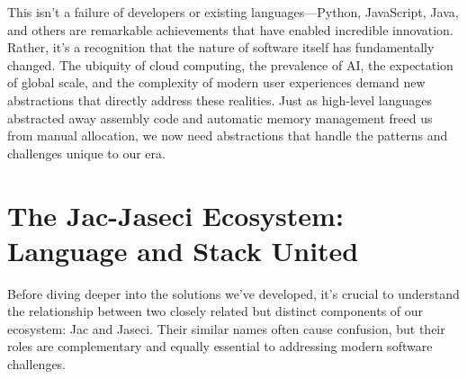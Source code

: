 This isn't a failure of developers or existing languages—Python, JavaScript, Java, and others are remarkable achievements that have enabled incredible innovation. Rather, it's a recognition that the nature of software itself has fundamentally changed. The ubiquity of cloud computing, the prevalence of AI, the expectation of global scale, and the complexity of modern user experiences demand new abstractions that directly address these realities. Just as high-level languages abstracted away assembly code and automatic memory management freed us from manual allocation, we now need abstractions that handle the patterns and challenges unique to our era.

\section{The Jac-Jaseci Ecosystem: Language and Stack United}

Before diving deeper into the solutions we've developed, it's crucial to understand the relationship between two closely related but distinct components of our ecosystem: Jac and Jaseci. Their similar names often cause confusion, but their roles are complementary and equally essential to addressing modern software challenges.

